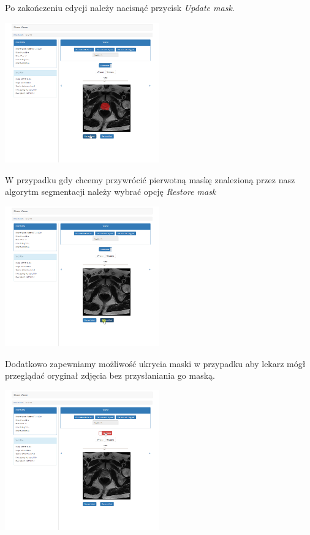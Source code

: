 \documentclass[a4paper,11pt,twoside]{report}
\theoremstyle{definition}
\begin{document}
Po zakończeniu edycji należy nacisnąć przycisk \textit{Update mask}.

\begin{minipage}{\linewidth}
	\centering
	\includegraphics[width=0.5\textwidth]{FrontScreen/Editing/170.png}
\end{minipage}

W przypadku gdy chcemy przywrócić pierwotną maskę znalezioną przez nasz algorytm segmentacji należy wybrać opcję \textit{Restore mask}

\begin{minipage}{\linewidth}
	\centering
	\includegraphics[width=0.5\textwidth]{FrontScreen/Editing/323.png}
\end{minipage}

Dodatkowo zapewniamy możliwość ukrycia maski w przypadku aby lekarz mógł przeglądać oryginał zdjęcia bez przysłaniania go maską.

\begin{minipage}{\linewidth}
	\centering
	\includegraphics[width=0.5\textwidth]{FrontScreen/Editing/366.png}
\end{minipage}
\end{document}
